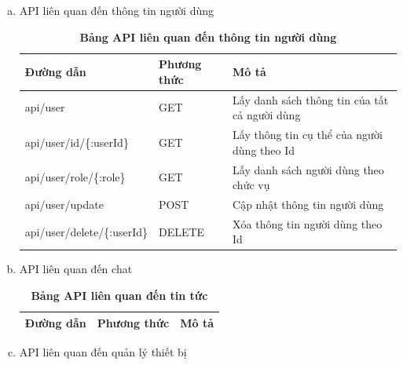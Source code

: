 \begin{enumerate}[a)]
  \item API liên quan đến thông tin người dùng
  

  \begin{table}[H]
    \centering
    \caption{\bfseries \fontsize{12pt}{0pt}\selectfont Bảng API liên quan đến thông tin người dùng}
    \begin{tabularx}{0.9\textwidth}{
    | >{\raggedright\arraybackslash}X
    | >{\raggedright\arraybackslash}m{2cm}
    | >{\raggedright\arraybackslash}X|
    }
    \hline
    \bfseries Đường dẫn    &\bfseries Phương thức    &\bfseries Mô tả\\ \hline
   api/user   &   GET  &  Lấy danh sách thông tin của tất cả người dùng \\  \hline
   api/user/id/\{:userId\}  &   GET     & Lấy thông tin cụ thể của người dùng theo Id \\ \hline
   api/user/role/\{:role\}  &   GET     & Lấy danh sách người dùng theo chức vụ \\ \hline
   api/user/update   &    POST    &  Cập nhật thông tin người dùng \\  \hline
   api/user/delete/\{:userId\}  &   DELETE     & Xóa thông tin người dùng theo Id \\ \hline

    \end{tabularx}
    \label{table_api_user}
\end{table}

\item API liên quan đến chat


\begin{table}[H]
  \centering
  \caption{\bfseries \fontsize{12pt}{0pt}\selectfont Bảng API liên quan đến tin tức}
  \begin{tabularx}{0.9\textwidth}{
  | >{\raggedright\arraybackslash}X
  | >{\raggedright\arraybackslash}m{2cm}
  | >{\raggedright\arraybackslash}X|
  }
  \hline
  \bfseries Đường dẫn    &\bfseries Phương thức    &\bfseries Mô tả\\ \hline

  \end{tabularx}
  \label{table_api_chats}
\end{table}
\item API liên quan đến quản lý thiết bị



\end{enumerate}
